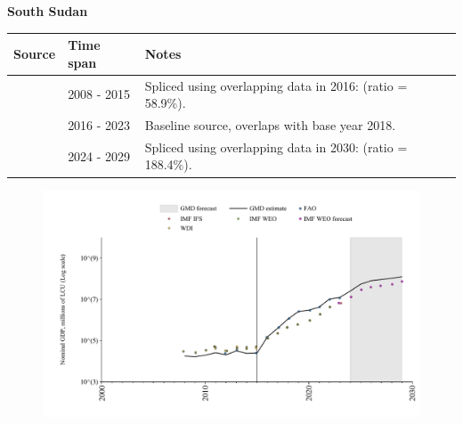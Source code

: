 \documentclass[12pt,a4paper,landscape]{article}
\begin{document}
\begin{adjustbox}{max totalsize={\paperwidth}{\paperheight},center}
\begin{minipage}[t][\textheight][t]{\textwidth}
\vspace*{0.5cm}
{}
\begin{center}
{\Large\bfseries South Sudan}
\end{center}
\vspace{0.5cm}
\begin{table}[H]
\centering
\small
\begin{tabular}{|l|l|l|}
\hline
\textbf{Source} & \textbf{Time span} & \textbf{Notes} \\
\hline
\rowcolor{white}\cite{WDI}& 2008 - 2015 &Spliced using overlapping data in 2016: (ratio = 58.9\%).\\
\rowcolor{lightgray}\cite{FAO}& 2016 - 2023 &Baseline source, overlaps with base year 2018.\\
\rowcolor{white}\cite{IMF_WEO_forecast}& 2024 - 2029 &Spliced using overlapping data in 2030: (ratio = 188.4\%).\\
\hline
\end{tabular}
\end{table}
\begin{figure}[H]
\centering
\includegraphics[width=\textwidth,height=0.6\textheight,keepaspectratio]{graphs/SSD_nGDP.pdf}
\end{figure}
\end{minipage}
\end{adjustbox}
\end{document}
